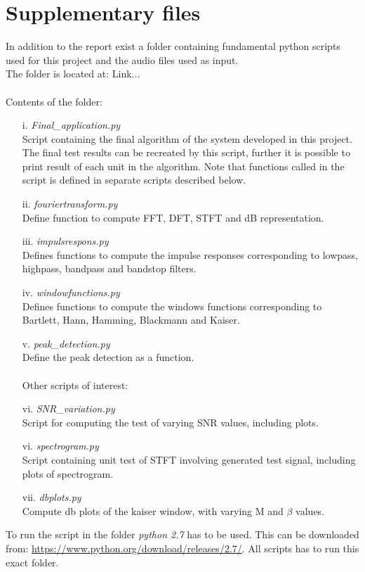 \clearpage
\chapter{Supplementary files} \label{app:sup}
In addition to the report exist a folder containing fundamental python scripts used for this project and the audio files used as input. 
\\
The folder is located at: Link... \\
\\
Contents of the folder:
\begin{itemize}
\item[i.]\textit{Final\_application.py} \\
Script containing the final algorithm of the system developed in this project. The final test results can be recreated by this script, further it is possible to print result of each unit in the algorithm. Note that functions called in the script is defined in separate scripts described below.   

\item[ii.]\textit{fouriertransform.py}\\
Define function to compute FFT, DFT, STFT and dB representation.
 
\item[iii.] \textit{impulsrespons.py}\\
Defines functions to compute the impulse responses corresponding to lowpass, highpass, bandpass and bandstop filters.
\item[iv.] \textit{windowfunctions.py}\\
Defines functions to compute the windows functions corresponding to Bartlett, Hann, Hamming, Blackmann and Kaiser. 
\item[v.] \textit{peak\_detection.py} \\
Define the peak detection as a function.
\\
\\
Other scripts of interest:
\item[vi.] \textit{SNR\_variation.py} \\
Script for computing the test of varying SNR values, including plots.  
\item[vi.]\textit{spectrogram.py}\\
Script containing unit test of STFT involving generated test signal, including plots of spectrogram. 
\item[vii.] \textit{dbplots.py} \\
Compute db plots of the kaiser window, with varying M and $\beta$ values. 
  
\end{itemize}

To run the script in the folder \textit{python 2.7} has to be used. This can be downloaded from: \url{https://www.python.org/download/releases/2.7/}. All scripts has to run this exact folder. 
